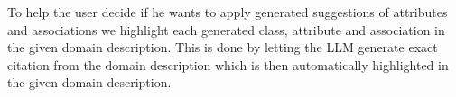 To help the user decide if he wants to apply generated suggestions of attributes and associations we highlight each generated class, attribute and association in the given domain description. This is done by letting the LLM generate exact citation from the domain description which is then automatically highlighted in the given domain description.